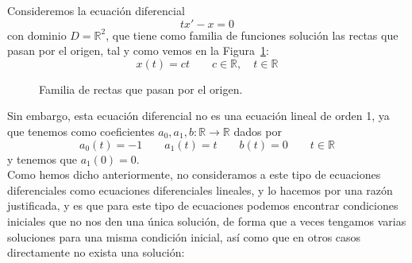 \begin{ejemplo}
    Consideremos la ecuación diferencial
    \begin{equation*}
        tx'-x = 0
    \end{equation*}
    con dominio $D=\mathbb{R}^2$, que tiene como familia de funciones solución las rectas que pasan por el origen, tal y como vemos en la Figura~\ref{fig:familia_rectas_origen}:
    \begin{equation*}
        x(t) = ct \qquad c\in \mathbb{R}, \quad t\in \mathbb{R}
    \end{equation*}

\begin{figure}[H]
\centering    
{}
\caption{Familia de rectas que pasan por el origen.}
\label{fig:familia_rectas_origen}
\end{figure}
    Sin embargo, esta ecuación diferencial no es una ecuación lineal de orden 1, ya que tenemos como coeficientes $a_0,a_1,b:\mathbb{R}\rightarrow\mathbb{R}$ dados por
    \begin{equation*}
        a_0(t) = -1 \qquad a_1(t) = t \qquad b(t) = 0 \qquad t\in \mathbb{R}
    \end{equation*}
    y tenemos que $a_1(0) = 0$.\\

    Como hemos dicho anteriormente, no consideramos a este tipo de ecuaciones diferenciales como ecuaciones diferenciales lineales, y lo hacemos por una razón justificada, y es que para este tipo de ecuaciones podemos encontrar condiciones iniciales que no nos den una única solución, de forma que a veces tengamos varias soluciones para una misma condición inicial, así como que en otros casos directamente no exista una solución:


\end{ejemplo}
